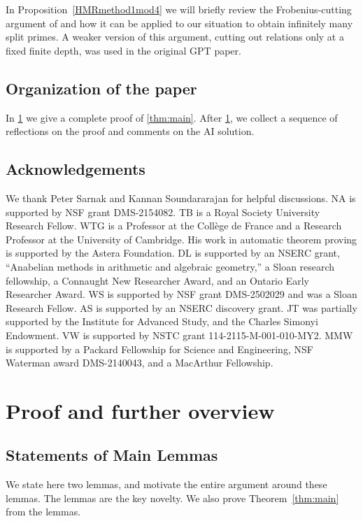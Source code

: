\documentclass[11pt,reqno]{amsart}
\numberwithin{equation}{section}
\theoremstyle{definition}
\theoremstyle{remark}
\begin{document}
In Proposition~\ref{HMRmethod1mod4} we will briefly review
the Frobenius-cutting argument of \cite{hajir2021cutting}
and how it can be applied to our situation to obtain infinitely many split primes.
A weaker version of this argument, cutting out relations only at a fixed finite depth,
was used in the original GPT paper.


\subsection{Organization of the paper}
In \cref{sec:proof} we give a complete proof of \cref{thm:main}. After \cref{sec:proof}, we collect a sequence of reflections on the proof and comments on the AI solution.

\subsection*{Acknowledgements}

We thank 
Peter Sarnak and Kannan Soundararajan
for helpful discussions.
NA is supported by NSF grant DMS-2154082. TB is a Royal Society University Research Fellow. WTG is a Professor at the Coll\`ege de France and a Research Professor at the University of Cambridge. His work in automatic theorem proving is supported by the Astera Foundation. DL is supported by an NSERC grant, “Anabelian methods in arithmetic and algebraic geometry,” a Sloan research fellowship, a Connaught New Researcher Award, and an Ontario Early Researcher Award. WS is supported by NSF grant DMS-2502029 and was a Sloan Research Fellow. AS is supported by an NSERC discovery grant. JT was partially supported by the Institute for Advanced Study, and the Charles Simonyi Endowment. VW is supported by NSTC grant 114-2115-M-001-010-MY2. MMW is supported by a
Packard Fellowship for Science and Engineering,  NSF Waterman award DMS-2140043, and a MacArthur Fellowship.


\section{Proof and further overview}\label{sec:proof}

\subsection{Statements of Main Lemmas}

We state here two lemmas, and motivate the entire argument around these lemmas.  The lemmas are the key novelty.  We also prove Theorem~\ref{thm:main} from the lemmas.
\end{document}
